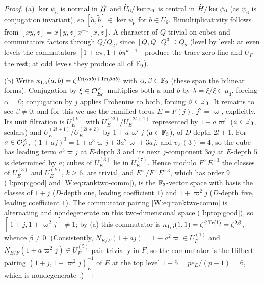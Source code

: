 \begin{proof}
(a) $\ker\psi_6$ is normal in $\widetilde H$ and $\widetilde U_6/\ker\psi_6$ is central
in $\widetilde H/\ker\psi_6$ (as $\psi_6$ is conjugation invariant), so
$[\tilde a,\tilde b]\in\ker\psi_6$ for $b\in U_6$.  Bimultiplicativity
follows from $[xy,z]=x[y,z]x^{-1}[x,z]$.  A character of $Q$ trivial on
cubes and commutators factors through $Q/Q_2$, since
$[Q,Q]Q^3\supseteq Q_2$ (level by level: at even levels the commutators
$[1+a\pi,1+b\pi^{k-1}]$ produce the trace-zero line and $U_F$ the rest;
at odd levels they produce all of $\mathbb F_9$).

(b) Write $\kappa_{1,5}(a,b)=\zeta^{\operatorname{Tr}(\alpha ab)+\operatorname{Tr}(\beta a\bar b)}$ with
$\alpha,\beta\in\mathbb F_9$ (these span the bilinear forms).  Conjugation
by $\xi\in\mathcal O_{E_0}^\times$ multiplies both $a$ and $b$ by
$\lambda=\xi/\bar\xi\in\mu_4$, forcing $\alpha=0$; conjugation by $j$
applies Frobenius to both, forcing $\beta\in\mathbb F_3$.  It remains to see
$\beta\ne0$, and for this we use the ramified torus $E=F(j)$,
$j^2=\varpi$, explicitly.  Its unit filtration is $U_E^{(k)}$ with
$U_E^{(2l)}/U_E^{(2l+1)}$ represented by $1+a\varpi^l$ ($a\in\mathbb F_3$, scalars)
and $U_E^{(2l+1)}/U_E^{(2l+2)}$ by $1+a\varpi^lj$ ($a\in\mathbb F_3$), of
$D$-depth $2l+1$.  For $a\in\mathcal O_F^\times$,
$(1+aj)^3=1+a^3\varpi j+3a^2\varpi+3aj$, and $v_E(3)=4$, so the cube
has leading term $a^3\varpi j$ at $E$-depth $3$ and its next
$j$-component $3aj$ at $E$-depth $5$ is determined by $a$; cubes of
$U_E^{(3)}$ lie in $U_E^{(7)}$.  Hence modulo $F^\times E^{\times3}$ the
classes of $U_E^{(3)}$ and $U_E^{(k)}$, $k\ge6$, are trivial, and
$E^\times/F^\times E^{\times3}$, which has order $9$ (\cref{I:prop:good} and \eqref{W:eq:ranktwo-comm}), is the $\mathbb F_3$-vector space
with basis the classes of $1+j$ ($D$-depth one, leading coefficient
$1$) and $1+\varpi^2j$ ($D$-depth five, leading coefficient $1$).  The
commutator pairing \eqref{W:eq:ranktwo-comm} is alternating and
nondegenerate on this two-dimensional space (\cref{I:prop:good}),
so $[\,\widetilde{1+j},\widetilde{1+\varpi^2j}\,]\ne1$; by (a) this
commutator is $\kappa_{1,5}(1,1)=\zeta^{\beta\operatorname{Tr}(1)}=\zeta^{2\beta}$,
whence $\beta\ne0$.  (Consistently, $N_{E/F}(1+aj)=1-a^2\varpi\in U_F^{(1)}$
and $N_{E/F}(1+a\varpi^2j)\in U_F^{(5)}$ pair trivially in $F$, so the
commutator is the Hilbert pairing $(1+j,1+\varpi^2j)_E^{-1}$ of $E$ at the
top level $1+5=pe_E/(p-1)=6$, which is nondegenerate \cite[Ch.~IV]{FV02}.)


\end{proof}
